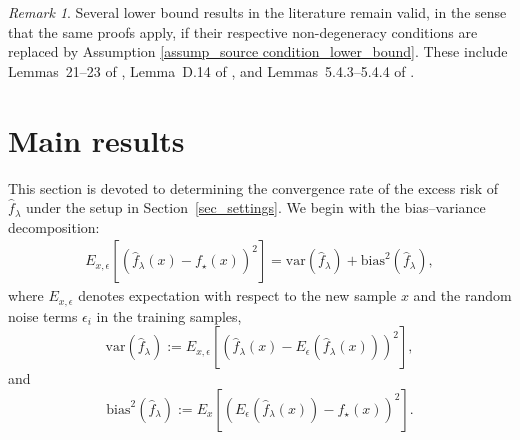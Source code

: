 \documentclass{article}
\theoremstyle{plain}
\theoremstyle{definition}
\theoremstyle{remark}
\newtheorem{remark}[theorem]{Remark}
\newcommand{\dhnote}[1]{{\color{red}[#1]} } %
\begin{document}
\begin{remark}
    Several lower bound results in the literature remain valid, in the sense that the same proofs apply, if their respective non-degeneracy conditions are replaced by Assumption \ref{assump_source condition_lower_bound}. 
    These include Lemmas~21--23 of \cite{zhang2024optimal}, Lemma~D.14 of \cite{lu2024saturation}, and Lemmas~5.4.3--5.4.4 of \cite{zhang2024phase}. 
\end{remark}








\section{Main results}\label{sec_main_results}

This section is devoted to determining the convergence rate of the excess risk of $\hat{f}_{\lambda}$ under the setup in Section~\ref{sec_settings}. 
We begin with the bias--variance decomposition:
\begin{align}\label{eq bias var decomposition}
    E_{x, \epsilon} \left[ \left(\hat{f}_{\lambda}(x) - f_{\star}(x) \right)^{2} \right] =  \mathrm{var}(\hat{f}_{\lambda}) + \mathrm{bias}^2(\hat{f}_{\lambda}),
\end{align}
where $E_{x, \epsilon}$ denotes expectation with respect to the new sample $x$ and the random noise terms $\epsilon_i$ in the training samples,
\begin{equation}\label{eq var term}
    \mathrm{var}(\hat{f}_{\lambda}) := E_{x, \epsilon}\left[\left(\hat{f}_{\lambda}(x)-E_\epsilon\left(\hat{f}_{\lambda}(x)\right)\right)^2\right],
\end{equation}
and
\begin{equation}\label{eq bias term}
    \mathrm{bias}^2(\hat{f}_{\lambda}) := E_x\left[\left(E_\epsilon\left(\hat{f}_{\lambda}(x)\right)-f_{\star}(x)\right)^2\right].
\end{equation}
\end{document}
